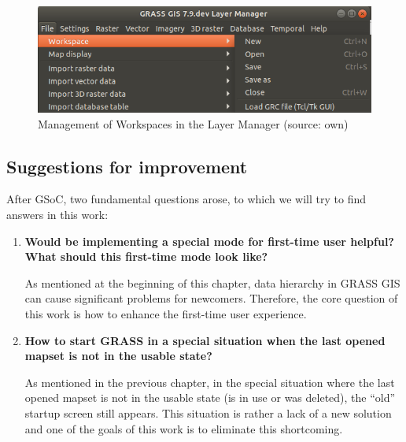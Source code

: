\documentclass[a4paper,10pt,twoside]{article}
\begin{document}
\vspace{0.3cm}
\begin{figure}[hbt!] 
\begin{center}
\includegraphics[width=14cm]{../pictures/workspace_grass.png} 
\caption[Management of Workspaces in the Layer Manager]{Management of Workspaces in the Layer Manager (source: own)}
\label{fig:workspace_grass}
\end{center}
\end{figure}


\newpage
\vspace*{-1cm}
\subsection{Suggestions for improvement}

After GSoC, two fundamental questions arose, to which we will try to find answers in this work:

\begin{enumerate}

\item  \noindent \textbf{Would be implementing a special mode for first-time user helpful? What should this first-time mode look like?}

\noindent As mentioned at the beginning of this chapter, data hierarchy in GRASS GIS can cause significant problems for newcomers. Therefore, the core question of this work is how to enhance the first-time user experience.

\item \noindent \textbf{How to start GRASS in a special situation when the last opened mapset is not in the usable state?}

As mentioned in the previous chapter, in the special situation where the last opened mapset is not in the usable state (is in use or was deleted), the ``old'' startup screen still appears. This situation is rather a lack of a new solution and one of the goals of this work is to eliminate this shortcoming. 

\end{enumerate}
\end{document}
